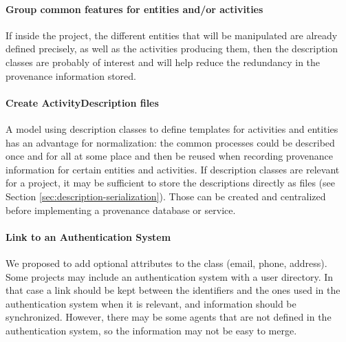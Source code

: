 \paragraph{Group common features for entities and/or activities}
If inside the project, the different entities that will be manipulated are already defined precisely, as well as the activities producing them, then the description classes are probably of interest and will help reduce
 the redundancy in the provenance information stored. 

\paragraph{Create ActivityDescription files}
A model using description classes to define templates for activities and
entities has an advantage for normalization: the common processes could be
described once and for all at some place and then be reused when recording
provenance information for certain entities and activities.
If description classes are relevant for a project, it may be sufficient to store the descriptions directly as  files (see Section \ref{sec:description-serialization}). 
Those can be created and centralized before implementing a provenance database or service.

\paragraph{Link to an Authentication System}
We proposed to add optional attributes to the  class (email, phone, address). Some projects may include an authentication system with a user directory. In that case a link should be kept between the  identifiers and the ones used in the authentication system when it is relevant, and information should be synchronized. However, there may be some agents that are not defined in the authentication system, so the information may not be easy to merge.

